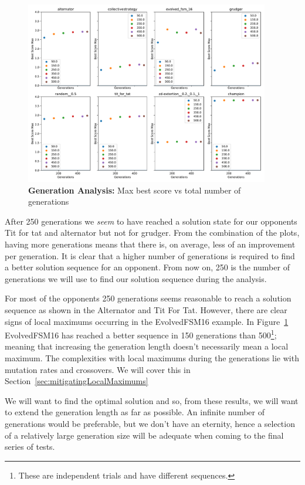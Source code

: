\begin{figure}[ht] 
    \includegraphics[width=0.95\textwidth, keepaspectratio, center]{./img/plots/GENS_max_bs_v_gens_all.pdf}
\caption{\textbf{Generation Analysis:} Max best score vs total number of generations}\label{fig:GENS-max-bs-v-gens-all}
\end{figure}

After 250 generations we \textit{seem} to have reached a solution state for our opponents Tit for tat and alternator but not for grudger.
From the combination of the plots, having more generations means that there is, on average, less of an improvement per generation.
It is clear that a higher number of generations is required to find a better solution sequence for an opponent.
From now on, 250 is the number of generations we will use to find our solution sequence during the analysis.

For most of the opponents 250 generations seems reasonable to reach a solution sequence as shown in the Alternator and Tit For Tat.
However, there are clear signs of local maximums occurring in the EvolvedFSM16 example.
In Figure~\ref{fig:GENS-max-bs-v-gens-all} EvolvedFSM16 has reached a better sequence in 150 generations than 500\footnote{These are independent trials and have different sequences.}; meaning that increasing the generation length doesn't necessarily mean a local maximum.
The complexities with local maximums during the generations lie with mutation rates and crossovers.
We will cover this in Section~\ref{sec:mitigatingLocalMaximums}

We will want to find the optimal solution and so, from these results, we will want to extend the generation length as far as possible.
An infinite number of generations would be preferable, but we don't have an eternity, hence a selection of a relatively large generation size will be adequate when coming to the final series of tests.

